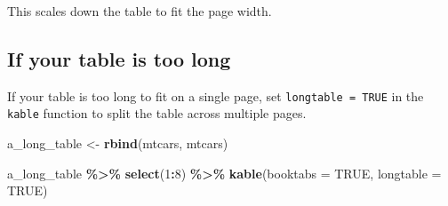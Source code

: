\documentclass[a4paper, nobind]{templates/ociamthesis}
\newenvironment{Shaded}{\begin{snugshade}}{\end{snugshade}}
\newcommand{\AttributeTok}[1]{\textcolor[rgb]{0.13,0.29,0.53}{#1}}
\newcommand{\ConstantTok}[1]{\textcolor[rgb]{0.56,0.35,0.01}{#1}}
\newcommand{\DecValTok}[1]{\textcolor[rgb]{0.00,0.00,0.81}{#1}}
\newcommand{\FunctionTok}[1]{\textcolor[rgb]{0.13,0.29,0.53}{\textbf{#1}}}
\newcommand{\NormalTok}[1]{#1}
\newcommand{\OtherTok}[1]{\textcolor[rgb]{0.56,0.35,0.01}{#1}}
\newcommand{\SpecialCharTok}[1]{\textcolor[rgb]{0.81,0.36,0.00}{\textbf{#1}}}
\renewenvironment{Shaded}
{
  \vspace{10pt}%
  \begin{snugshade}%
}{%
  \end{snugshade}%
  \vspace{8pt}%
}
\begin{document}
This scales down the table to fit the page width.

\subsection{If your table is too long}\label{if-your-table-is-too-long}

If your table is too long to fit on a single page, set \texttt{longtable\ =\ TRUE} in the \texttt{kable} function to split the table across multiple pages.

\begin{Shaded}
\begin{Highlighting}[]
\NormalTok{a\_long\_table }\OtherTok{\textless{}{-}} \FunctionTok{rbind}\NormalTok{(mtcars, mtcars)}

\NormalTok{a\_long\_table }\SpecialCharTok{\%\textgreater{}\%} 
  \FunctionTok{select}\NormalTok{(}\DecValTok{1}\SpecialCharTok{:}\DecValTok{8}\NormalTok{) }\SpecialCharTok{\%\textgreater{}\%} 
  \FunctionTok{kable}\NormalTok{(}\AttributeTok{booktabs =} \ConstantTok{TRUE}\NormalTok{, }\AttributeTok{longtable =} \ConstantTok{TRUE}\NormalTok{)}
\end{Highlighting}
\end{Shaded}
\end{document}
